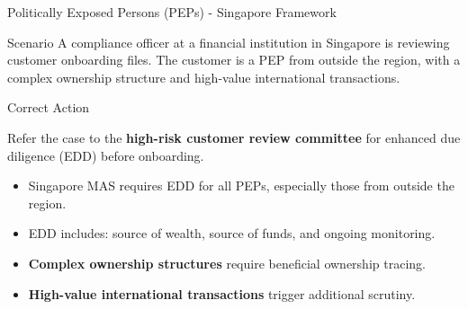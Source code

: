 \documentclass{beamer}
\begin{document}
	\begin{frame}{Politically Exposed Persons (PEPs) - Singapore Framework}
		\begin{block}{Scenario}
			A compliance officer at a financial institution in Singapore is reviewing customer onboarding files. The customer is a PEP from outside the region, with a complex ownership structure and high-value international transactions.
		\end{block}
		\begin{block}{Correct Action}
			\begin{center}
				Refer the case to the \textbf{high-risk customer review committee} for enhanced due diligence (EDD) before onboarding.
			\end{center}
		\end{block}
		\begin{itemize}
			\item Singapore MAS requires EDD for all PEPs, especially those from outside the region.
			\item EDD includes: source of wealth, source of funds, and ongoing monitoring.
			\item \textbf{Complex ownership structures} require beneficial ownership tracing.
			\item \textbf{High-value international transactions} trigger additional scrutiny.
		\end{itemize}
	\end{frame}
	
\end{document}
